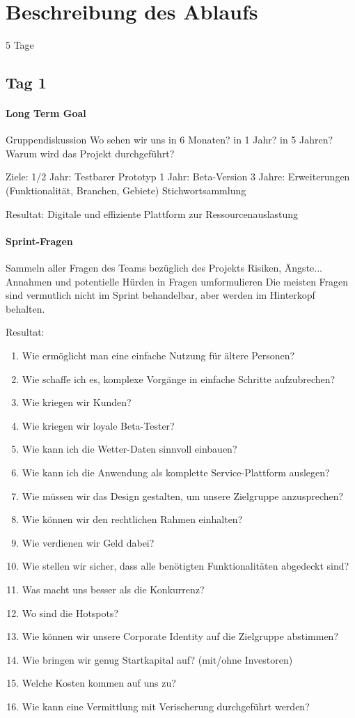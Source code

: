 \section{Beschreibung des Ablaufs}
5 Tage

\subsection{Tag 1}
\paragraph{Long Term Goal}
Gruppendiskussion
Wo sehen wir uns in 6 Monaten? in 1 Jahr? in 5 Jahren?
Warum wird das Projekt durchgeführt?

Ziele:
1/2 Jahr: Testbarer Prototyp
1 Jahr: Beta-Version
3 Jahre: Erweiterungen (Funktionalität, Branchen, Gebiete)
Stichwortsammlung

Resultat: Digitale und effiziente Plattform zur Ressourcenauslastung
\paragraph{Sprint-Fragen}
Sammeln aller Fragen des Teams bezüglich des Projekts
Risiken, Ängste...
Annahmen und potentielle Hürden in Fragen umformulieren
Die meisten Fragen sind vermutlich nicht im Sprint behandelbar, aber werden im Hinterkopf behalten.

Resultat: 

\begin{enumerate}
	\item Wie ermöglicht man eine einfache Nutzung für ältere Personen?
	\item Wie schaffe ich es, komplexe Vorgänge in einfache Schritte aufzubrechen?
	\item Wie kriegen wir Kunden?
	\item Wie kriegen wir loyale Beta-Tester?
	\item Wie kann ich die Wetter-Daten sinnvoll einbauen?
	\item Wie kann ich die Anwendung als komplette Service-Plattform auslegen?
	\item Wie müssen wir das Design gestalten, um unsere Zielgruppe anzusprechen?
	\item Wie können wir den rechtlichen Rahmen einhalten?
	\item Wie verdienen wir Geld dabei?
	\item Wie stellen wir sicher, dass alle benötigten Funktionalitäten abgedeckt sind?
	\item Was macht uns besser als die Konkurrenz?
	\item Wo sind die Hotspots?
	\item Wie können wir unsere Corporate Identity auf die Zielgruppe abstimmen?
	\item Wie bringen wir genug Startkapital auf? (mit/ohne Investoren)
	\item Welche Kosten kommen auf uns zu?
	\item Wie kann eine Vermittlung mit Verischerung durchgeführt werden?
\end{enumerate}
